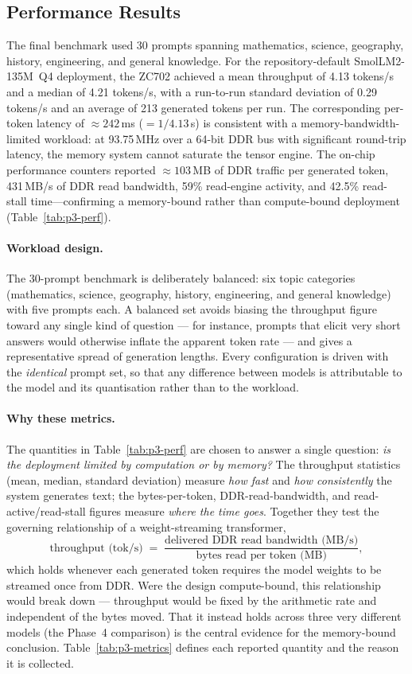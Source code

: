\subsection{Performance Results}

The final benchmark used 30 prompts spanning mathematics, science, geography, history, engineering,
and general knowledge. For the repository-default SmolLM2-135M~Q4 deployment, the ZC702 achieved a
mean throughput of 4.13 tokens/s and a median of 4.21 tokens/s, with a run-to-run standard deviation
of 0.29 tokens/s and an average of 213 generated tokens per run. The corresponding per-token latency
of $\approx 242$\,ms ($=1/4.13$\,s) is consistent with a memory-bandwidth-limited workload: at
93.75\,MHz over a 64-bit DDR bus with significant round-trip latency, the memory system cannot
saturate the tensor engine. The on-chip performance counters reported $\approx 103$\,MB of DDR
traffic per generated token, 431\,MB/s of DDR read bandwidth, 59\% read-engine activity, and 42.5\%
read-stall time---confirming a memory-bound rather than compute-bound deployment
(Table~\ref{tab:p3-perf}).

\paragraph{Workload design.} The 30-prompt benchmark is deliberately balanced: six topic categories
(mathematics, science, geography, history, engineering, and general knowledge) with five prompts
each. A balanced set avoids biasing the throughput figure toward any single kind of question --- for
instance, prompts that elicit very short answers would otherwise inflate the apparent token rate ---
and gives a representative spread of generation lengths. Every configuration is driven with the
\emph{identical} prompt set, so that any difference between models is attributable to the model and
its quantisation rather than to the workload.

\paragraph{Why these metrics.} The quantities in Table~\ref{tab:p3-perf} are chosen to answer a
single question: \emph{is the deployment limited by computation or by memory?} The throughput
statistics (mean, median, standard deviation) measure \emph{how fast} and \emph{how consistently}
the system generates text; the bytes-per-token, DDR-read-bandwidth, and read-active/read-stall
figures measure \emph{where the time goes}. Together they test the governing relationship of a
weight-streaming transformer,
\[
\text{throughput (tok/s)} \;=\;
\frac{\text{delivered DDR read bandwidth (MB/s)}}{\text{bytes read per token (MB)}},
\]
which holds whenever each generated token requires the model weights to be streamed once from DDR.
Were the design compute-bound, this relationship would break down --- throughput would be fixed by
the arithmetic rate and independent of the bytes moved. That it instead holds across three very
different models (the Phase~4 comparison) is the central evidence for the memory-bound conclusion.
Table~\ref{tab:p3-metrics} defines each reported quantity and the reason it is collected.

